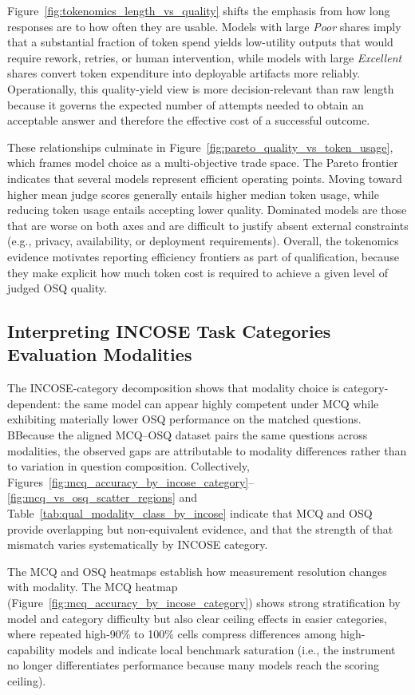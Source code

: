 Figure~\ref{fig:tokenomics_length_vs_quality} shifts the emphasis from how long responses are to how often they are usable. Models with large \textit{Poor} shares imply that a substantial fraction of token spend yields low-utility outputs that would require rework, retries, or human intervention, while models with large \textit{Excellent} shares convert token expenditure into deployable artifacts more reliably. Operationally, this quality-yield view is more decision-relevant than raw length because it governs the expected number of attempts needed to obtain an acceptable answer and therefore the effective cost of a successful outcome.

These relationships culminate in Figure~\ref{fig:pareto_quality_vs_token_usage}, which frames model choice as a multi-objective trade space. The Pareto frontier indicates that several models represent efficient operating points. Moving toward higher mean judge scores generally entails higher median token usage, while reducing token usage entails accepting lower quality. Dominated models are those that are worse on both axes and are difficult to justify absent external constraints (e.g., privacy, availability, or deployment requirements). Overall, the tokenomics evidence motivates reporting efficiency frontiers as part of qualification, because they make explicit how much token cost is required to achieve a given level of judged OSQ quality.


\subsection{Interpreting INCOSE Task Categories Evaluation Modalities}
\label{subsec:interpret_modality_task_mapping}

The INCOSE-category decomposition shows that modality choice is category-dependent: the same model can appear highly competent under MCQ while exhibiting materially lower OSQ performance on the matched questions. BBecause the aligned MCQ--OSQ dataset pairs the same questions across modalities, the observed gaps are attributable to modality differences rather than to variation in question composition. Collectively, Figures~\ref{fig:mcq_accuracy_by_incose_category}--\ref{fig:mcq_vs_osq_scatter_regions} and Table~\ref{tab:qual_modality_class_by_incose} indicate that MCQ and OSQ provide overlapping but non-equivalent evidence, and that the strength of that mismatch varies systematically by INCOSE category.

The MCQ and OSQ heatmaps establish how measurement resolution changes with modality. The MCQ heatmap (Figure~\ref{fig:mcq_accuracy_by_incose_category}) shows strong stratification by model and category difficulty but also clear ceiling effects in easier categories, where repeated high-90\% to 100\% cells compress differences among high-capability models and indicate local benchmark saturation (i.e., the instrument no longer differentiates performance because many models reach the scoring ceiling). 

